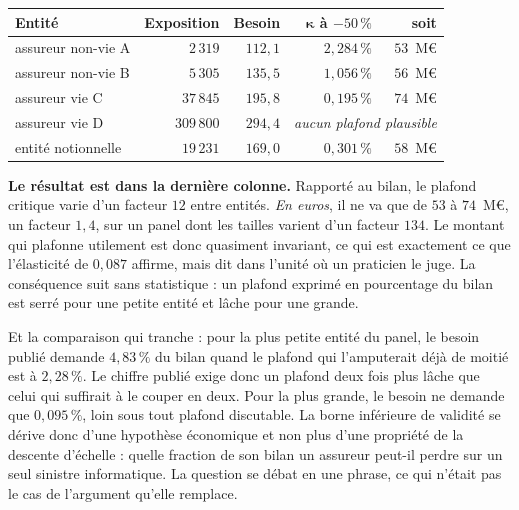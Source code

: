\begin{center}\footnotesize
\renewcommand{\arraystretch}{1.2}
\begin{tabular}{@{}l r r r r@{}}
\toprule
\textbf{Entité} & \textbf{Exposition} & \textbf{Besoin} & $\boldsymbol{\kappa}$ \textbf{à $-50\,\%$} &
\textbf{soit} \\
\midrule
assureur non-vie A & $2\,319$ & $112{,}1$ & $2{,}284\,\%$ & $53$~M\euro \\
assureur non-vie B & $5\,305$ & $135{,}5$ & $1{,}056\,\%$ & $56$~M\euro \\
assureur vie C & $37\,845$ & $195{,}8$ & $0{,}195\,\%$ & $74$~M\euro \\
assureur vie D & $309\,800$ & $294{,}4$ & \multicolumn{2}{l}{\emph{aucun plafond plausible}} \\
entité notionnelle & $19\,231$ & $169{,}0$ & $0{,}301\,\%$ & $58$~M\euro \\
\bottomrule
\end{tabular}
\end{center}

\vspace{4pt}
\noindent \textbf{Le résultat est dans la dernière colonne.} Rapporté au bilan, le plafond
critique varie d'un facteur $12$ entre entités. \emph{En euros}, il ne va que de $53$ à
$74$~M\euro, un facteur $1{,}4$, sur un panel dont les tailles varient d'un facteur $134$. Le
montant qui plafonne utilement est donc quasiment invariant, ce qui est exactement ce
que l'élasticité de $0{,}087$ affirme, mais dit dans l'unité où un praticien le juge. La
conséquence suit sans statistique : un plafond exprimé en pourcentage du bilan est serré pour une
petite entité et lâche pour une grande.

Et la comparaison qui tranche : pour la plus petite entité du panel, le besoin publié demande
$4{,}83\,\%$ du bilan quand le plafond qui l'amputerait déjà de moitié est à $2{,}28\,\%$. Le
chiffre publié exige donc un plafond deux fois plus lâche que celui qui suffirait à le
couper en deux. Pour la plus grande, le besoin ne demande que $0{,}095\,\%$, loin sous tout
plafond discutable. La borne inférieure de validité se dérive donc d'une hypothèse
économique et non plus d'une propriété de la descente d'échelle : quelle fraction de son bilan
un assureur peut-il perdre sur un seul sinistre informatique. La question se débat en une phrase,
ce qui n'était pas le cas de l'argument qu'elle remplace.

